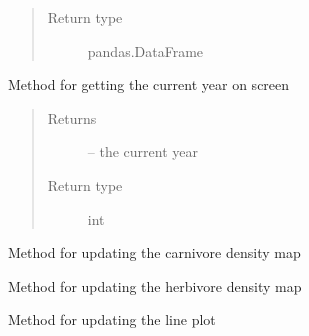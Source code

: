 \documentclass[a4paper,10pt,english]{sphinxmanual}
\begin{document}
\begin{fulllineitems}
\begin{fulllineitems}
\begin{quote}
\begin{description}
\item[{Return type}] \leavevmode
pandas.DataFrame

\end{description}\end{quote}

\end{fulllineitems}


\begin{fulllineitems}
\label{\detokenize{simulation:biosim.simulation.BioSim.status_year}}
Method for getting the current year on screen
\begin{quote}\begin{description}
\item[{Returns}] \leavevmode
{} -- the current year

\item[{Return type}] \leavevmode
int

\end{description}\end{quote}

\end{fulllineitems}


\begin{fulllineitems}
\label{\detokenize{simulation:biosim.simulation.BioSim.update_carnivore_density_map}}
Method for updating the carnivore density map

\end{fulllineitems}


\begin{fulllineitems}
\label{\detokenize{simulation:biosim.simulation.BioSim.update_herbivore_density_map}}
Method for updating the herbivore density map

\end{fulllineitems}


\begin{fulllineitems}
\label{\detokenize{simulation:biosim.simulation.BioSim.update_line_plot}}
Method for updating the line plot


\end{fulllineitems}
\end{fulllineitems}
\end{document}
